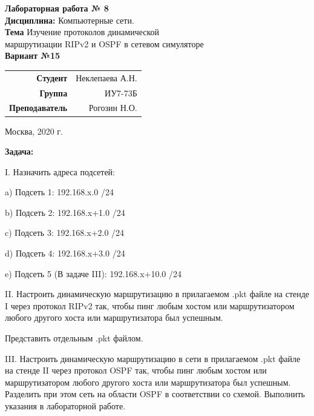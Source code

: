\documentclass[a4paper,14pt]{extreport} %
\begin{document}
\begin{titlepage}
	\vspace{2cm}
	
	\begin{center}
		\textbf{Лабораторная работа № 8} \\
		\textbf{Дисциплина:}  Компьютерные сети.  \\
		\textbf{Тема} 
		Изучение протоколов динамической \\ маршрутизации RIPv2 и OSPF в сетевом симуляторе\\
		\textbf{Вариант №15} \\
	\end{center}

    \vspace{4cm}
    
	\begin{flushright}
		\begin{tabular}{rr}
			\textbf{Студент} & Неклепаева А.Н. \\
			\textbf{Группа} & ИУ7-73Б \\
			\textbf{Преподаватель} & Рогозин Н.О.   \\
		\end{tabular}
	\end{flushright}
	
	\vspace{7cm}
	
	\begin{center}
		Москва, 2020 г.
	\end{center}
	
\end{titlepage}

\textbf{Задача:} 

I. Назначить адреса подсетей:

a) Подсеть 1: 192.168.x.0 /24

b) Подсеть 2: 192.168.x+1.0 /24

c) Подсеть 3: 192.168.x+2.0 /24

d) Подсеть 4: 192.168.x+3.0 /24

e) Подсеть 5 (В задаче III): 192.168.x+10.0 /24

II. Настроить динамическую маршрутизацию в прилагаемом .pkt файле на стенде I через протокол RIPv2 так, чтобы пинг любым хостом или маршрутизатором любого другого хоста или маршрутизатора был успешным.

Представить отдельным .pkt файлом. 

III. Настроить динамическую маршрутизацию в сети в прилагаемом .pkt файле на стенде II через протокол OSPF так, чтобы пинг любым хостом или маршрутизатором любого другого хоста или маршрутизатора был успешным. Разделить при этом сеть на области OSPF в соответствии со схемой. Выполнить указания в лабораторной работе.
\end{document}
